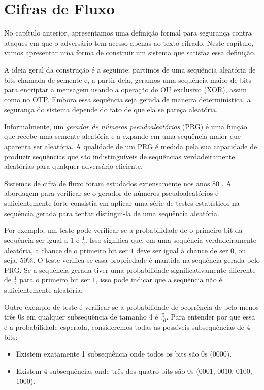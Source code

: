 \chapter{Cifras de Fluxo}
\label{cha:cifras-de-fluxo}

No capítulo anterior, apresentamos uma definição formal para segurança contra ataques em que o adversário tem acesso apenas ao texto cifrado.
Neste capítulo, vamos apresentar uma forma de construir um sistema que satisfaz essa definição.

A ideia geral da construção é a seguinte:
partimos de uma sequência aleatória de bits chamada de semente e, a partir dela, geramos uma sequência maior de bits para encriptar a mensagem usando a operação de OU exclusivo (XOR), assim como no OTP.
Embora essa sequência seja gerada de maneira determinística, a segurança do sistema depende do fato de que ela se pareça aleatória.

Informalmente, um {\em gerador de números pseudoaleatórios} (PRG) é uma função que recebe uma semente aleatória e a expande em uma sequência maior que aparenta ser aleatória.
A qualidade de um PRG é medida pela sua capacidade de produzir sequências que são indistinguíveis de sequências verdadeiramente aleatórias para qualquer adversário eficiente.

Sistemas de cifra de fluxo foram estudados extensamente nos anos 80 \cite{Blum84,Yao82}.
A abordagem para verificar se o gerador de números pseudoaleatórios é suficientemente forte consistia em aplicar uma série de testes estatísticos na sequência gerada para tentar distingui-la de uma sequência aleatória.

Por exemplo, um teste pode verificar se a probabilidade de o primeiro bit da sequência ser igual a $1$ é $\frac{1}{2}$.
Isso significa que, em uma sequência verdadeiramente aleatória, a chance de o primeiro bit ser $1$ deve ser igual à chance de ser $0$, ou seja, $50\%$.
O teste verifica se essa propriedade é mantida na sequência gerada pelo PRG.
Se a sequência gerada tiver uma probabilidade significativamente diferente de $\frac{1}{2}$ para o primeiro bit ser $1$, isso pode indicar que a sequência não é suficientemente aleatória.

Outro exemplo de teste é verificar se a probabilidade de ocorrência de pelo menos três $0$s em qualquer subsequência de tamanho 4 é $\frac{5}{16}$.
Para entender por que essa é a probabilidade esperada, consideremos todas as possíveis subsequências de 4 bits:

\begin{itemize}
\item Existem exatamente 1 subsequência onde todos os bits são $0$s ($0000$).
\item Existem 4 subsequências onde três dos quatro bits são $0$s ($0001$, $0010$, $0100$, $1000$).
\end{itemize}

